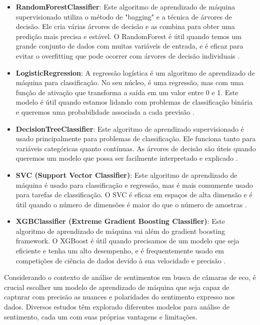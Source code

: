 \begin{itemize}
	\item \textbf{RandomForestClassifier}: Este algoritmo de aprendizado de máquina supervisionado utiliza o método de "bagging" e a técnica de árvores de decisão. Ele cria várias árvores de decisão e as combina para obter uma predição mais precisa e estável. O RandomForest é útil quando temos um grande conjunto de dados com muitas variáveis de entrada, e é eficaz para evitar o overfitting que pode ocorrer com árvores de decisão individuais \cite[5-32]{2001_Breiman}.
	\item \textbf{LogisticRegression}: A regressão logística é um algoritmo de aprendizado de máquina para classificação. No seu núcleo, é uma regressão, mas com uma função de ativação que transforma a saída em um valor entre 0 e 1. Este modelo é útil quando estamos lidando com problemas de classificação binária e queremos uma probabilidade associada a cada previsão \cite[215-242]{1958_Cox}.
	\item \textbf{DecisionTreeClassifier}: Este algoritmo de aprendizado supervisionado é usado principalmente para problemas de classificação. Ele funciona tanto para variáveis categóricas quanto contínuas. As árvores de decisão são úteis quando queremos um modelo que possa ser facilmente interpretado e explicado \cite[81-106]{1986_Quinlan}.
	\item \textbf{SVC (Support Vector Classifier)}: Este algoritmo de aprendizado de máquina é usado para classificação e regressão, mas é mais comumente usado para tarefas de classificação. O SVC é eficaz em espaços de alta dimensão e é útil quando o número de dimensões é maior do que o número de amostras \cite[273-297]{1995_Cortes}.
	\item \textbf{XGBClassifier (Extreme Gradient Boosting Classifier)}: Este algoritmo de aprendizado de máquina vai além do gradient boosting framework. O XGBoost é útil quando precisamos de um modelo que seja eficiente e tenha um alto desempenho, e é frequentemente usado em competições de ciência de dados devido à sua velocidade e precisão \cite[785-794]{2016_Chen_IP}.
\end{itemize}

Considerando o contexto de análise de sentimentos em busca de câmaras de eco, é crucial escolher um modelo de aprendizado de máquina que seja capaz de capturar com precisão as nuances e polaridades do sentimento expresso nos dados. Diversos estudos têm explorado diferentes modelos para análise de sentimento, cada um com suas próprias vantagens e limitações.

